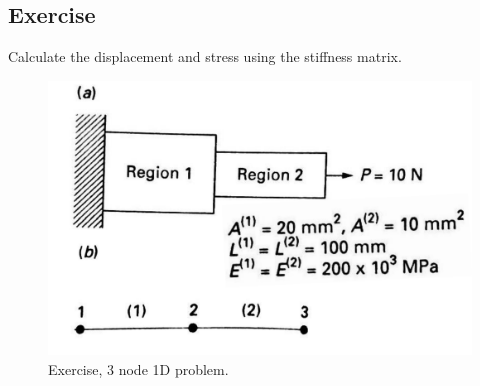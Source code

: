 \subsection{Exercise}
Calculate the displacement and stress using the stiffness matrix.
\begin{figure}[H]
	\centering
	\includegraphics[width = \textwidth]{./img/figure4.png}
	\caption{Exercise, 3 node 1D problem.}
\end{figure}
